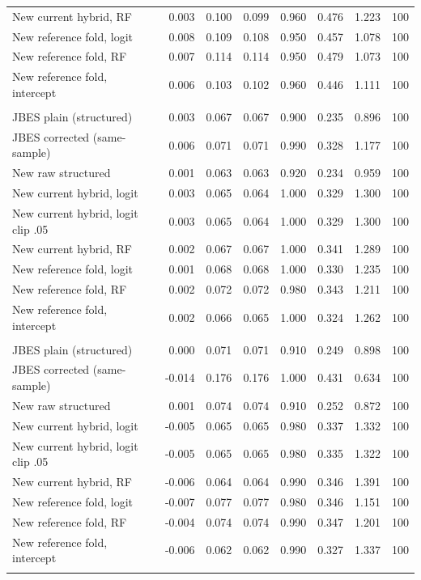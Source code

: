 {\begin{longtable}{lrrrrrrr}
\quad New current hybrid, RF & 0.003 & 0.100 & 0.099 & 0.960 & 0.476 & 1.223 & 100 \\
\quad New reference fold, logit & 0.008 & 0.109 & 0.108 & 0.950 & 0.457 & 1.078 & 100 \\
\quad New reference fold, RF & 0.007 & 0.114 & 0.114 & 0.950 & 0.479 & 1.073 & 100 \\
\quad New reference fold, intercept & 0.006 & 0.103 & 0.102 & 0.960 & 0.446 & 1.111 & 100 \\
\addlinespace
\multicolumn{8}{l}{\textit{serial, degree $d=1$}} \\
\quad JBES plain (structured) & 0.003 & 0.067 & 0.067 & 0.900 & 0.235 & 0.896 & 100 \\
\quad JBES corrected (same-sample) & 0.006 & 0.071 & 0.071 & 0.990 & 0.328 & 1.177 & 100 \\
\quad New raw structured & 0.001 & 0.063 & 0.063 & 0.920 & 0.234 & 0.959 & 100 \\
\quad New current hybrid, logit & 0.003 & 0.065 & 0.064 & 1.000 & 0.329 & 1.300 & 100 \\
\quad New current hybrid, logit clip .05 & 0.003 & 0.065 & 0.064 & 1.000 & 0.329 & 1.300 & 100 \\
\quad New current hybrid, RF & 0.002 & 0.067 & 0.067 & 1.000 & 0.341 & 1.289 & 100 \\
\quad New reference fold, logit & 0.001 & 0.068 & 0.068 & 1.000 & 0.330 & 1.235 & 100 \\
\quad New reference fold, RF & 0.002 & 0.072 & 0.072 & 0.980 & 0.343 & 1.211 & 100 \\
\quad New reference fold, intercept & 0.002 & 0.066 & 0.065 & 1.000 & 0.324 & 1.262 & 100 \\
\addlinespace
\multicolumn{8}{l}{\textit{serial, degree $d=2$}} \\
\quad JBES plain (structured) & 0.000 & 0.071 & 0.071 & 0.910 & 0.249 & 0.898 & 100 \\
\quad JBES corrected (same-sample) & -0.014 & 0.176 & 0.176 & 1.000 & 0.431 & 0.634 & 100 \\
\quad New raw structured & 0.001 & 0.074 & 0.074 & 0.910 & 0.252 & 0.872 & 100 \\
\quad New current hybrid, logit & -0.005 & 0.065 & 0.065 & 0.980 & 0.337 & 1.332 & 100 \\
\quad New current hybrid, logit clip .05 & -0.005 & 0.065 & 0.065 & 0.980 & 0.335 & 1.322 & 100 \\
\quad New current hybrid, RF & -0.006 & 0.064 & 0.064 & 0.990 & 0.346 & 1.391 & 100 \\
\quad New reference fold, logit & -0.007 & 0.077 & 0.077 & 0.980 & 0.346 & 1.151 & 100 \\
\quad New reference fold, RF & -0.004 & 0.074 & 0.074 & 0.990 & 0.347 & 1.201 & 100 \\
\quad New reference fold, intercept & -0.006 & 0.062 & 0.062 & 0.990 & 0.327 & 1.337 & 100 \\
\addlinespace
\end{longtable}
}
